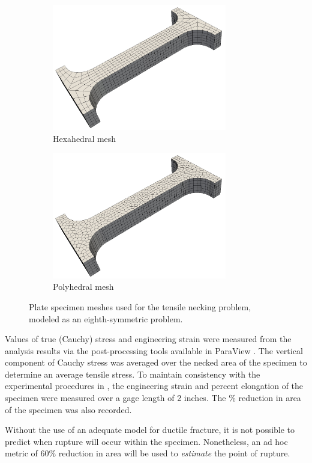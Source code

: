 \begin{figure}[!h]
  \centering
    \begin{subfigure}[b]{0.49\linewidth}
            \centering
            \includegraphics[width=3.0in]{figures/neck_hex_mesh.pdf}
    			\caption{Hexahedral mesh \label{fig:necking_hex_mesh}}
    \end{subfigure}
	\begin{subfigure}[b]{0.49\linewidth}
            \centering
            \includegraphics[width=3.0in]{figures/neck_poly_mesh.pdf}
    			\caption{Polyhedral mesh \label{fig:necking_poly_mesh}}
    \end{subfigure} \caption{Plate specimen meshes used for the tensile necking problem, modeled as an eighth-symmetric problem.}
  \label{fig:necking_meshes}
\end{figure}

Values of true (Cauchy) stress and engineering strain were measured from the analysis results via the post-processing tools available in ParaView \cite{ParaView}. The vertical component of Cauchy stress was averaged over the necked area of the specimen to determine an average tensile stress. To maintain consistency with the experimental procedures in \cite{Gerberich:62}, the engineering strain and percent elongation of the specimen were measured over a gage length of 2 inches. The \% reduction in area of the specimen was also recorded.

Without the use of an adequate model for ductile fracture, it is not possible to predict when rupture will occur within the specimen. Nonetheless, an ad hoc metric of 60\% reduction in area will be used to \textit{estimate} the point of rupture.

